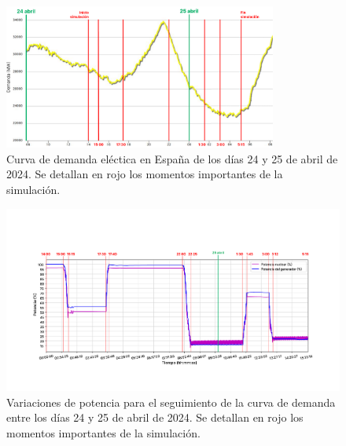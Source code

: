 \begin{figure}[!h]
  \centering
  \includegraphics[width=0.8\textwidth]{content/figures/curva_demanda.pdf}
  \caption{Curva de demanda eléctica en España de los días 24 y 25 de abril de 2024. Se detallan en rojo los momentos importantes de la simulación.}
  \label{fig:curva_demanda}
\end{figure}

\begin{figure}[!h]
  \centering
  \includegraphics[width=\textwidth]{content/figures/sim4_potencias_contextualizacion.pdf}
  \caption{Variaciones de potencia para el seguimiento de la curva de demanda entre los días 24 y 25 de abril de 2024. Se detallan en rojo los momentos importantes de la simulación.}
  \label{fig:sim4_potencias_contextualizacion}
\end{figure}

